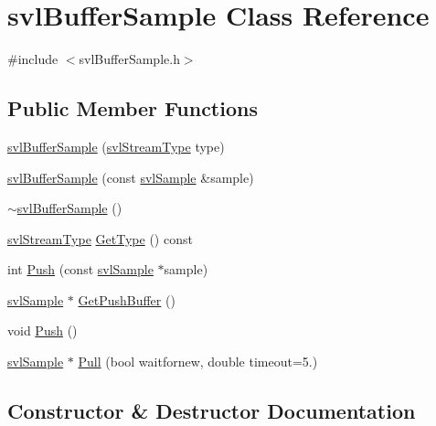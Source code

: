 \hypertarget{classsvl_buffer_sample}{}\section{svl\+Buffer\+Sample Class Reference}
\label{classsvl_buffer_sample}


{\ttfamily \#include $<$svl\+Buffer\+Sample.\+h$>$}

\subsection*{Public Member Functions}
\begin{DoxyCompactItemize}
\item 
\hyperlink{classsvl_buffer_sample_ad2c9b17633a1a4ce9077f5741107b379}{svl\+Buffer\+Sample} (\hyperlink{svl_definitions_8h_aa00696d338a58db361335a01fd11e122}{svl\+Stream\+Type} type)
\item 
\hyperlink{classsvl_buffer_sample_adef693706c40294692cd56f98e94cb47}{svl\+Buffer\+Sample} (const \hyperlink{classsvl_sample}{svl\+Sample} \&sample)
\item 
\hyperlink{classsvl_buffer_sample_aa895b7c9775a76e960df4d56616e0998}{$\sim$svl\+Buffer\+Sample} ()
\item 
\hyperlink{svl_definitions_8h_aa00696d338a58db361335a01fd11e122}{svl\+Stream\+Type} \hyperlink{classsvl_buffer_sample_a98eeb89859fd8e9eb678fea1ab1a8d20}{Get\+Type} () const 
\item 
int \hyperlink{classsvl_buffer_sample_a80ad0e4ec9b1a58e8bc0980707ca761c}{Push} (const \hyperlink{classsvl_sample}{svl\+Sample} $\ast$sample)
\item 
\hyperlink{classsvl_sample}{svl\+Sample} $\ast$ \hyperlink{classsvl_buffer_sample_a0d76923009b81ad3e6639f5a8c3b9b42}{Get\+Push\+Buffer} ()
\item 
void \hyperlink{classsvl_buffer_sample_a9c9361afc2ad9809cdc84e210889c260}{Push} ()
\item 
\hyperlink{classsvl_sample}{svl\+Sample} $\ast$ \hyperlink{classsvl_buffer_sample_a9d033d97d1347fd0342401cdaa961b2c}{Pull} (bool waitfornew, double timeout=5.)
\end{DoxyCompactItemize}


\subsection{Constructor \& Destructor Documentation}
\hypertarget{classsvl_buffer_sample_ad2c9b17633a1a4ce9077f5741107b379}{}
